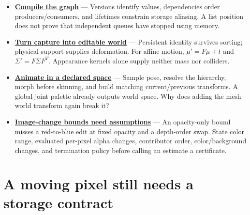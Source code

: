\begin{itemize}
\item
  \textbf{\href{Game\%20Engine\%20-\%20From\%20First\%20Frame\%20to\%20Living\%20Worlds\#2.\%20Compile\%20a\%20render\%20graph\%20before\%20executing\%20it}{Compile the graph}} --- Versions identify values, dependencies order producers/consumers, and lifetimes constrain storage aliasing. A list position does not prove that independent queues have stopped using memory.
\item
  \textbf{\href{Game\%20Engine\%20-\%20From\%20First\%20Frame\%20to\%20Living\%20Worlds\#Rendering\%20identity\%20becomes\%20world\%20identity\%20only\%20through\%20an\%20explicit\%20bridge}{Turn capture into editable world}} --- Persistent identity survives sorting; physical support supplies deformation. For affine motion, \(\mu'=F\mu+t\) and \(\Sigma'=F\Sigma F^T\). Appearance kernels alone supply neither mass nor colliders.
\item
  \textbf{\href{University\%20-\%20Worlds,\%20Images\%20and\%20Inference\%20-\%20Graphics,\%20Vision\%20and\%20Photography\#5.\%20Build\%20a\%20pose\%20first,\%20then\%20deform\%20the\%20surface}{Animate in a declared space}} --- Sample pose, resolve the hierarchy, morph before skinning, and build matching current/previous transforms. A global-joint palette already outputs world space. Why does adding the mesh world transform again break it?
\item
  \textbf{\href{Game\%20Engine\%20-\%20From\%20First\%20Frame\%20to\%20Living\%20Worlds\#An\%20image-change\%20certificate\%20must\%20name\%20the\%20edits\%20it\%20covers}{Image-change bounds need assumptions}} --- An opacity-only bound misses a red-to-blue edit at fixed opacity and a depth-order swap. State color range, evaluated per-pixel alpha changes, contributor order, color/background changes, and termination policy before calling an estimate a certificate.
\end{itemize}

\section{A moving pixel still needs a storage contract}\label{appendix-a8f634b076b5-a-moving-pixel-still-needs-a-storage-contract}

